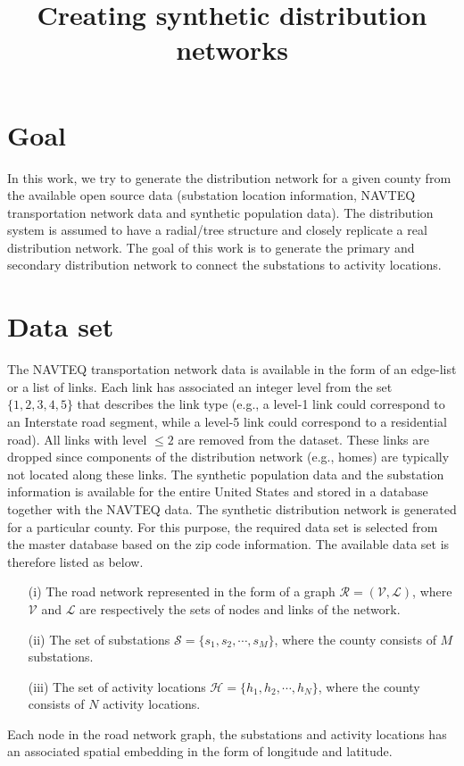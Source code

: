 \documentclass[12pt]{article}
\title{Creating synthetic distribution networks}
\begin{document}
	\maketitle
	\section{Goal}\label{sec:goal}
	In this work, we try to generate the distribution network for a given county from the available open source data (substation location information, NAVTEQ transportation network data and synthetic population data). The distribution system is assumed to have a radial/tree structure and closely replicate a real distribution network. The goal of this work is to generate the primary and secondary distribution network to connect the substations to activity locations.
	
	\section{Data set}\label{sec:dataset}
	The NAVTEQ transportation network data is available in the form of an edge-list or a list of links. Each link has associated an integer level from the set $\{1,2,3,4,5\}$ that describes the link type (e.g., a level-1 link could correspond to an Interstate road segment, while a level-5 link could correspond to a residential road). All links with level $\leq2$ are removed from the dataset. These links are dropped since	components of the distribution network (e.g., homes) are typically not located along these links. The synthetic population data and the substation information is available for the entire United States and stored in a database together with the NAVTEQ data. The synthetic distribution network is generated for a particular county. For this purpose, the required data set is selected from the master database based on the zip code information. The available data set is therefore listed as below.
	\begin{enumerate}
		\item[(i)] The road network represented in the form of a graph $\mathcal{R}=(\mathcal{V},\mathcal{L})$, where $\mathcal{V}$ and $\mathcal{L}$ are respectively the sets of nodes and links of the network. 
		\item[(ii)] The set of substations $\mathcal{S}=\{s_1,s_2,\cdots,s_M\}$, where the county consists of $M$ substations.
		\item[(iii)] The set of activity locations $\mathcal{H}=\{h_1,h_2,\cdots,h_N\}$, where the county consists of $N$ activity locations.
	\end{enumerate}
	Each node in the road network graph, the substations and activity locations has an associated spatial embedding in the form of longitude and latitude.
	
\end{document}
